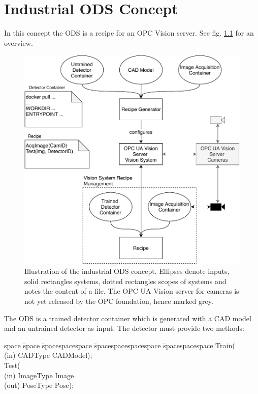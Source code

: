 \chapter{Industrial ODS Concept\label{cha:chapter3}}

In this concept the ODS is a recipe for an OPC Vision server. See fig. \ref{fig:concept} for an overview. 
\begin{figure}
    \centering
    \includegraphics[width=\textwidth]{img/Concept.pdf}
    \caption[Concept]{Illustration of the industrial ODS concept. Ellipses denote inputs, solid rectangles systems, dotted rectangles scopes of systems and notes the content of a file. The OPC UA Vision server for cameras is not yet released by the OPC foundation, hence marked grey.}
    \label{fig:concept}
\end{figure}

The ODS is a trained detector container which is generated with a CAD model and an untrained detector as input. The detector must provide two methods:
\begin{tabbing}
\label{detectormethods}
    space \= space \= spacespacespace \= spacespacespacespace \= spacespacespace \kill
    \>  Train(\\
    \>  \>  (in)	 \> 	CADType          \> CADModel); \\
    \>  Test(\\
    \>  \>  (in)	 \> 	ImageType     \> Image\\
    \>  \>  (out)	 \> 	PoseType           \> Pose); 
\end{tabbing}

